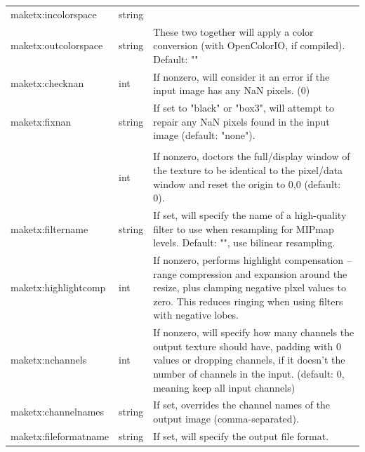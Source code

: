 \begin{longtable}{ >{\spc \cf\small}p{1.8in} >{\cf\small}l p{3in}}
   {\small maketx:incolorspace} & string & \\
   {\small maketx:outcolorspace} & string &
                          These two together will apply a color conversion
                              (with OpenColorIO, if compiled). Default: "" \\
   maketx:checknan & int &   If nonzero, will consider it an error if the
                              input image has any NaN pixels. (0) \\
   maketx:fixnan & string & If set to "black" or "box3", will attempt
                              to repair any NaN pixels found in the
                              input image (default: "none"). \\
   \multicolumn{2}{l}{\spc \cf\small maketx:set_full_to_pixels} \\ & int &
                          If nonzero, doctors the full/display window
                              of the texture to be identical to the
                              pixel/data window and reset the origin
                              to 0,0 (default: 0). \\
   maketx:filtername & string &
                          If set, will specify the name of a high-quality
                             filter to use when resampling for MIPmap
                             levels. Default: "", use bilinear resampling. \\
   maketx:highlightcomp & int &
                          If nonzero, performs highlight compensation --
                             range compression and expansion around 
                             the resize, plus clamping negative plxel
                             values to zero. This reduces ringing when
                             using filters with negative lobes. \\
   maketx:nchannels & int &  If nonzero, will specify how many channels
                             the output texture should have, padding with
                             0 values or dropping channels, if it doesn't
                             the number of channels in the input.
                             (default: 0, meaning keep all input channels) \\
   maketx:channelnames & string &
                          If set, overrides the channel names of the
                             output image (comma-separated). \\
   {\small maketx:fileformatname} & string &
                          If set, will specify the output file format.

\end{longtable}
